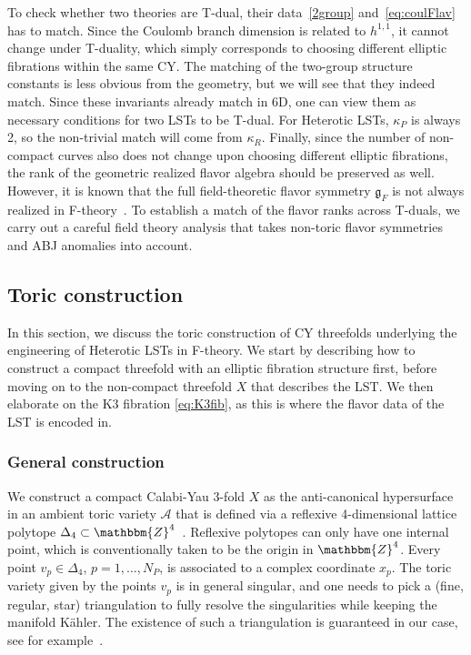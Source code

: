 \documentclass[11pt]{article}
\numberwithin{equation}{section}
\newcommand{\fg}{\mathfrak{g}}
\begin{document}
To check whether two theories are T-dual, their data~\eqref{2group} and~\eqref{eq:coulFlav} has to match. Since the Coulomb branch dimension is related to $h^{1,1}$, it cannot change under T-duality, which simply corresponds to choosing different elliptic fibrations within the same CY. The matching of the two-group structure constants is less obvious from the geometry, but we will see that they indeed match. Since these invariants already match in 6D, one can view them as necessary conditions for two LSTs to be T-dual. For Heterotic LSTs, $\kappa_{P}$ is always 2, so the non-trivial match will come from $\kappa_{R}$. Finally, since the number of non-compact curves also does not change upon choosing different elliptic fibrations, the rank of the geometric realized flavor algebra should be preserved as well. However, it is known that the full field-theoretic flavor symmetry $\fg_{F}$ is not always realized in F-theory~\cite{Bertolini:2015bwa}. To establish a match of the flavor ranks across T-duals, we carry out a careful field theory analysis that takes non-toric flavor symmetries and ABJ anomalies into account.


\subsection{Toric construction}
\label{sec:torcon}
In this section, we discuss the toric construction of CY threefolds underlying the engineering of Heterotic LSTs in F-theory. We start by describing how to construct a compact threefold with an elliptic fibration structure first, before moving on to the non-compact threefold $X$ that describes the LST. We then elaborate on the K3 fibration \eqref{eq:K3fib}, as this is where the flavor data of the LST is encoded in.
\subsubsection{General construction}
\label{sec:toriccons}
We construct a compact Calabi-Yau $3$-fold $X$ as the anti-canonical hypersurface in an ambient toric variety $\mathcal{A}$ that is defined via a reflexive 4-dimensional lattice polytope $\Delta_4\subset\mathbbm{Z}^4$~\cite{Batyrev:1994pg}. Reflexive polytopes can only have one internal point, which is conventionally taken to be the origin in $\mathbbm{Z}^{4}$. Every point $v_{p} \in \Delta_{4}$, $p=1,\ldots,N_P$, is associated to a complex coordinate $x_{p}$. The toric variety given by the points $v_p$ is in general singular, and one needs to pick a (fine, regular, star) triangulation to fully resolve the singularities while keeping the manifold K\"ahler. The existence of such a triangulation is guaranteed in our case, see for example~\cite{Huang:2019pne}.
\end{document}
